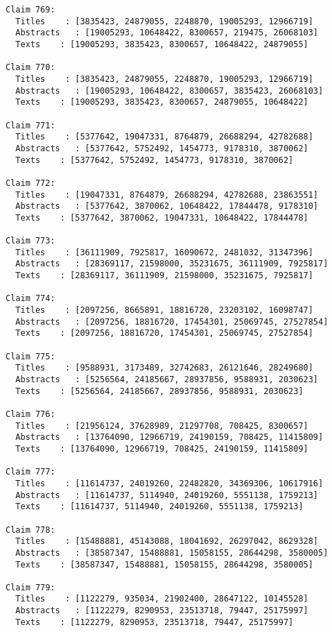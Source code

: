 \documentclass[11pt]{article}
\begin{document}
\begin{Verbatim}[commandchars=\\\{\}]
Claim 769:
  Titles    : [3835423, 24879055, 2248870, 19005293, 12966719]
  Abstracts   : [19005293, 10648422, 8300657, 219475, 26068103]
  Texts    : [19005293, 3835423, 8300657, 10648422, 24879055]

Claim 770:
  Titles    : [3835423, 24879055, 2248870, 19005293, 12966719]
  Abstracts   : [19005293, 10648422, 8300657, 3835423, 26068103]
  Texts    : [19005293, 3835423, 8300657, 24879055, 10648422]

Claim 771:
  Titles    : [5377642, 19047331, 8764879, 26688294, 42782688]
  Abstracts   : [5377642, 5752492, 1454773, 9178310, 3870062]
  Texts    : [5377642, 5752492, 1454773, 9178310, 3870062]

Claim 772:
  Titles    : [19047331, 8764879, 26688294, 42782688, 23863551]
  Abstracts   : [5377642, 3870062, 10648422, 17844478, 9178310]
  Texts    : [5377642, 3870062, 19047331, 10648422, 17844478]

Claim 773:
  Titles    : [36111909, 7925817, 16090672, 2481032, 31347396]
  Abstracts   : [28369117, 21598000, 35231675, 36111909, 7925817]
  Texts    : [28369117, 36111909, 21598000, 35231675, 7925817]

Claim 774:
  Titles    : [2097256, 8665891, 18816720, 23203102, 16098747]
  Abstracts   : [2097256, 18816720, 17454301, 25069745, 27527854]
  Texts    : [2097256, 18816720, 17454301, 25069745, 27527854]

Claim 775:
  Titles    : [9588931, 3173489, 32742683, 26121646, 28249680]
  Abstracts   : [5256564, 24185667, 28937856, 9588931, 2030623]
  Texts    : [5256564, 24185667, 28937856, 9588931, 2030623]

Claim 776:
  Titles    : [21956124, 37628989, 21297708, 708425, 8300657]
  Abstracts   : [13764090, 12966719, 24190159, 708425, 11415809]
  Texts    : [13764090, 12966719, 708425, 24190159, 11415809]

Claim 777:
  Titles    : [11614737, 24019260, 22482820, 34369306, 10617916]
  Abstracts   : [11614737, 5114940, 24019260, 5551138, 1759213]
  Texts    : [11614737, 5114940, 24019260, 5551138, 1759213]

Claim 778:
  Titles    : [15488881, 45143088, 18041692, 26297042, 8629328]
  Abstracts   : [38587347, 15488881, 15058155, 28644298, 3580005]
  Texts    : [38587347, 15488881, 15058155, 28644298, 3580005]

Claim 779:
  Titles    : [1122279, 935034, 21902400, 28647122, 10145528]
  Abstracts   : [1122279, 8290953, 23513718, 79447, 25175997]
  Texts    : [1122279, 8290953, 23513718, 79447, 25175997]


\end{Verbatim}
\end{document}
